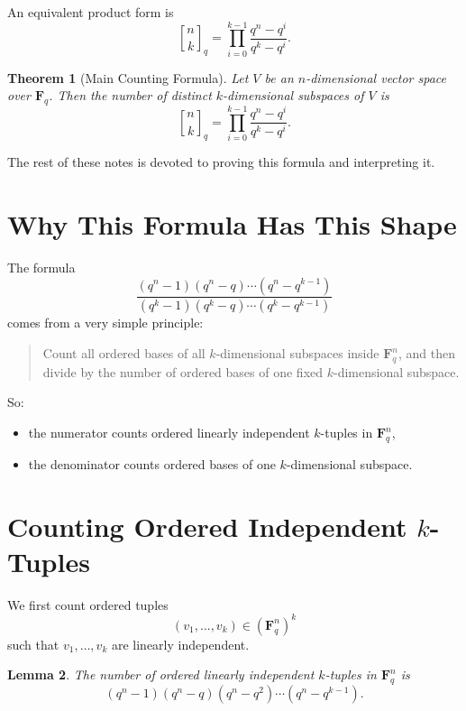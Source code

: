 \documentclass[11pt]{article}
\newtheorem{theorem}{Theorem}[section]
\newtheorem{lemma}[theorem]{Lemma}
\theoremstyle{definition}
\theoremstyle{remark}
\newcommand{\F}{\mathbf{F}}
\newcommand{\qbinom}[2]{\genfrac{[}{]}{0pt}{}{#1}{#2}_q}
\begin{document}
	An equivalent product form is
	\[
	\qbinom{n}{k}
	=
	\prod_{i=0}^{k-1}\frac{q^n-q^i}{q^k-q^i}.
	\]
	
	\begin{theorem}[Main Counting Formula]
		Let \(V\) be an \(n\)-dimensional vector space over \(\F_q\). Then the number of distinct \(k\)-dimensional subspaces of \(V\) is
		\[
		\boxed{
			\qbinom{n}{k}
			=
			\prod_{i=0}^{k-1}\frac{q^n-q^i}{q^k-q^i}
		}.
		\]
	\end{theorem}
	
	The rest of these notes is devoted to proving this formula and interpreting it.
	
	\section{Why This Formula Has This Shape}
	
	The formula
	\[
	\frac{(q^n-1)(q^n-q)\cdots(q^n-q^{k-1})}
	{(q^k-1)(q^k-q)\cdots(q^k-q^{k-1})}
	\]
	comes from a very simple principle:
	
	\begin{quote}
		Count all ordered bases of all \(k\)-dimensional subspaces inside \(\F_q^n\), and then divide by the number of ordered bases of one fixed \(k\)-dimensional subspace.
	\end{quote}
	
	So:
	\begin{itemize}
		\item the numerator counts ordered linearly independent \(k\)-tuples in \(\F_q^n\),
		\item the denominator counts ordered bases of one \(k\)-dimensional subspace.
	\end{itemize}
	
	\section{Counting Ordered Independent \(k\)-Tuples}
	
	We first count ordered tuples
	\[
	(v_1,\dots,v_k)\in (\F_q^n)^k
	\]
	such that \(v_1,\dots,v_k\) are linearly independent.
	
	\begin{lemma}
		The number of ordered linearly independent \(k\)-tuples in \(\F_q^n\) is
		\[
		(q^n-1)(q^n-q)(q^n-q^2)\cdots(q^n-q^{k-1}).
		\]
	\end{lemma}
	
\end{document}
